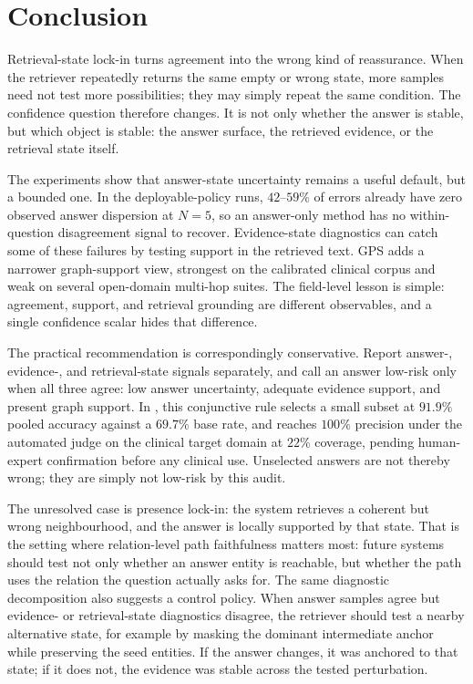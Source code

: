 \section{Conclusion}
\label{sec:conclusion}

Retrieval-state lock-in turns agreement into the wrong kind of reassurance.
When the retriever repeatedly returns the same empty or wrong state, more
samples need not test more possibilities; they may simply repeat the same
condition. The confidence question therefore changes. It is not only whether
the answer is stable, but which object is stable: the answer surface, the
retrieved evidence, or the retrieval state itself.

The experiments show that answer-state uncertainty remains a useful default,
but a bounded one. In the deployable-policy runs, $42$--$59\%$ of errors already
have zero observed answer dispersion at $N{=}5$, so an answer-only method has no
within-question disagreement signal to recover. Evidence-state diagnostics can
catch some of these failures by testing support in the retrieved text. GPS adds
a narrower graph-support view, strongest on the calibrated clinical corpus and
weak on several open-domain multi-hop suites. The field-level lesson is simple:
agreement, support, and retrieval grounding are different observables, and a
single confidence scalar hides that difference.

The practical recommendation is correspondingly conservative. Report answer-,
evidence-, and retrieval-state signals separately, and call an answer low-risk
only when all three agree: low answer uncertainty, adequate evidence support,
and present graph support. In \system{}, this conjunctive rule selects a small
subset at $91.9\%$ pooled accuracy against a $69.7\%$ base rate, and reaches
$100\%$ precision under the automated judge on the clinical target domain at
$22\%$ coverage, pending human-expert confirmation before any clinical use.
Unselected answers are not thereby wrong; they are simply not low-risk by this
audit.

The unresolved case is presence lock-in: the system retrieves a coherent but
wrong neighbourhood, and the answer is locally supported by that state.
That is the setting where relation-level path faithfulness matters most:
future systems should test not only whether an answer entity is reachable, but
whether the path uses the relation the question actually asks for. The same
diagnostic decomposition also suggests a control policy. When answer samples
agree but evidence- or retrieval-state diagnostics disagree, the retriever
should test a nearby alternative state, for example by masking the dominant
intermediate anchor while preserving the seed entities. If the answer changes,
it was anchored to that state; if it does not, the evidence was stable across
the tested perturbation.

